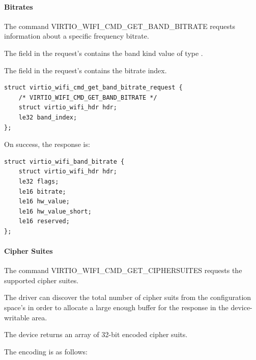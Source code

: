 \paragraph{Bitrates}\label{sec:Device Types / 802.11 Device / Device Operation / Querying Physical Properties / Bitrates}

The command VIRTIO_WIFI_CMD_GET_BAND_BITRATE requests information about a specific frequency bitrate.

The field  in the request's  contains the band kind value of type .

The field  in the request's  contains the bitrate index.

\begin{lstlisting}
struct virtio_wifi_cmd_get_band_bitrate_request {
	/* VIRTIO_WIFI_CMD_GET_BAND_BITRATE */
	struct virtio_wifi_hdr hdr;
	le32 band_index;
};
\end{lstlisting}

On success, the response is:

\begin{lstlisting}
struct virtio_wifi_band_bitrate {
	struct virtio_wifi_hdr hdr;
	le32 flags;
	le16 bitrate;
	le16 hw_value;
	le16 hw_value_short;
	le16 reserved;
};
\end{lstlisting}


\paragraph{Cipher Suites}\label{sec:Device Types / 802.11 Device / Device Operation / Querying Physical Properties / Cipher Suites}

The command VIRTIO_WIFI_CMD_GET_CIPHERSUITES requests the supported cipher suites.

The driver can discover the total number of cipher suits from the configuration
space's  in order to allocate a large enough buffer for
the response in the device-writable area.

The device returns an array of 32-bit encoded cipher suits.

The encoding is as follows:

